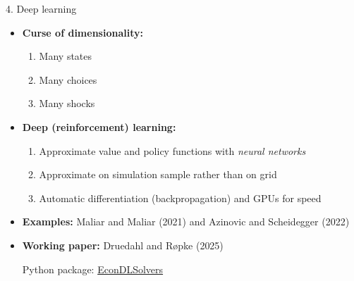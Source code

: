 \documentclass[
  10pt,
  ignorenonframetext,
  aspectratio=43,
  english,
]{beamer}
\providecommand{\tightlist}{%
  \setlength{\itemsep}{0pt}\setlength{\parskip}{0pt}}
\begin{document}
\begin{frame}{4. Deep learning}
\protect{}\label{deep-learning}
\begin{itemize}
\item
  \textbf{Curse of dimensionality:}

  \begin{enumerate}
  \tightlist
  \item
    Many states
  \item
    Many choices
  \item
    Many shocks
  \end{enumerate}
\item
  \textbf{Deep (reinforcement) learning:}

  \begin{enumerate}
  \tightlist
  \item
    Approximate value and policy functions with \emph{neural networks}
  \item
    Approximate on simulation sample rather than on grid
  \item
    Automatic differentiation (backpropagation) and GPUs for speed
  \end{enumerate}
\item
  \textbf{Examples:} Maliar and Maliar (2021) and Azinovic and
  Scheidegger (2022)
\item
  \textbf{Working paper:} Druedahl and Røpke (2025)

  Python package:
  \href{https://github.com/NumEconCopenhagen/EconDLSolvers}{EconDLSolvers}
\end{itemize}
\end{frame}
\end{document}
